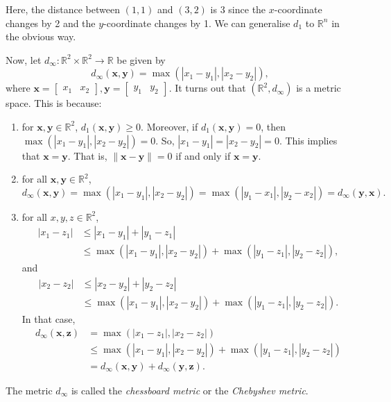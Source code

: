 \documentclass[a4paper, openany]{memoir}
\theoremstyle{definition}
\theoremstyle{plain}
\begin{document}
\noindent Here, the distance between $(1, 1)$ and $(3, 2)$ is 3 since the $x$-coordinate changes by 2 and the $y$-coordinate changes by 1. We can generalise $d_1$ to $\mathbb{R}^n$ in the obvious way.

Now, let $d_\infty: \mathbb{R}^2 \times \mathbb{R}^2 \to \mathbb{R}$ be given by
\[d_\infty(\bm{x}, \bm{y}) = \max(|x_1 - y_1|, |x_2 - y_2|),\]
where $\bm{x} = \begin{bmatrix}
x_1 & x_2
\end{bmatrix}, \bm{y} = \begin{bmatrix}
y_1 & y_2
\end{bmatrix}$. It turns out that $(\mathbb{R}^2, d_\infty)$ is a metric space. This is because:
\begin{enumerate}[label=\textbf{M\arabic*}.]
    \item for $\bm{x}, \bm{y} \in \mathbb{R}^2$, $d_1(\bm{x}, \bm{y}) \geqslant 0$. Moreover, if $d_1(\bm{x}, \bm{y}) = 0$, then $\max(|x_1 - y_1|, |x_2 - y_2|) = 0$. So, $|x_1 - y_1| = |x_2 - y_2| = 0$. This implies that $\bm{x} = \bm{y}$. That is, $\lVert \bm{x} - \bm{y} \rVert = 0$ if and only if $\bm{x} = \bm{y}$.
    
    \item for all $\bm{x}, \bm{y} \in \mathbb{R}^2$,
    \[d_\infty(\bm{x}, \bm{y}) = \max(|x_1 - y_1|, |x_2 - y_2|) = \max(|y_1 - x_1|, |y_2 - x_2|) = d_\infty(\bm{y}, \bm{x}).\]
    
    \item for all $x, y, z \in \mathbb{R}^2$,
    \begin{align*}
        |x_1 - z_1| &\leqslant |x_1 - y_1| + |y_1 - z_1| \\
        &\leqslant \max(|x_1 - y_1|, |x_2 - y_2|) + \max(|y_1 - z_1|, |y_2 - z_2|),
    \end{align*}
    and
    \begin{align*}
        |x_2 - z_2| &\leqslant |x_2 - y_2| + |y_2 - z_2| \\
        &\leqslant \max(|x_1 - y_1|, |x_2 - y_2|) + \max(|y_1 - z_1|, |y_2 - z_2|).
    \end{align*}
    In that case,
    \begin{align*}
        d_\infty(\bm{x}, \bm{z}) &= \max(|x_1 - z_1|, |x_2 - z_2|) \\
        &\leqslant \max(|x_1 - y_1|, |x_2 - y_2|) + \max(|y_1 - z_1|, |y_2 - z_2|) \\
        &= d_\infty(\bm{x}, \bm{y}) + d_\infty(\bm{y}, \bm{z}).
    \end{align*}
\end{enumerate}
The metric $d_\infty$ is called the \emph{chessboard metric} or the \emph{Chebyshev metric}.
\end{document}
